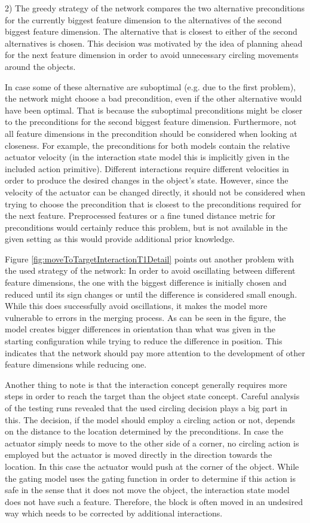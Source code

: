 2) The greedy strategy of the network compares the two alternative preconditions for the currently biggest feature dimension to the alternatives of the second biggest feature dimension. The alternative that is closest to either of the second alternatives is chosen. This decision was motivated by the idea of planning ahead for the next feature dimension in order to avoid unnecessary circling movements around the objects.

In case some of these alternative are suboptimal (e.g. due to the first problem), the network might choose a bad precondition, even if the other alternative would have been optimal. That is because the suboptimal preconditions might be closer to the preconditions for the second biggest feature dimension. 
Furthermore, not all feature dimensions in the precondition should be considered when looking at closeness. For example, the preconditions for both models contain the relative actuator velocity (in the interaction state model this is implicitly given in the included action primitive). 
Different interactions require different velocities in order to produce the desired changes in the object's state. 
However, since the velocity of the actuator can be changed directly, it should not be considered when trying to choose the precondition that is closest to the preconditions required for the next feature. 
Preprocessed features or a fine tuned distance metric for preconditions would certainly reduce this problem, but is not available in the given setting as this would provide additional prior knowledge.

Figure \ref{fig:moveToTargetInteractionT1Detail} points out another problem with the used strategy of the network: In order to avoid oscillating between different feature dimensions, the one with the biggest difference is initially chosen and reduced until its sign changes or until the difference is considered small enough. While this does successfully avoid oscillations, it makes the model more vulnerable to errors in the merging process. As can be seen in the figure, the model creates bigger differences in orientation than what was given in the starting configuration while trying to reduce the difference in position. This indicates that the network should pay more attention to the development of other feature dimensions while reducing one.

Another thing to note is that the interaction concept generally requires more steps in order to reach the target than the object state concept. Careful analysis of the testing runs revealed that the used circling decision plays a big part in this. The decision, if the model should employ a circling action or not, depends on the distance to the location determined by the preconditions. In case the actuator simply needs to move to the other side of a corner, no circling action is employed but the actuator is moved directly in the direction towards the location. In this case the actuator would push at the corner of the object. While the gating model uses the gating function in order to determine if this action is safe in the sense that it does not move the object, the interaction state model does not have such a feature. Therefore, the block is often moved in an undesired way which needs to be corrected by additional interactions.

